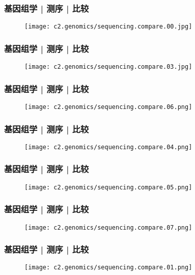 \begin{frame}
  \frametitle{基因组学 | 测序 | 比较}
  \begin{figure}
    \centering
    \texttt{[image: c2.genomics/sequencing.compare.00.jpg]}
  \end{figure}
\end{frame}

\begin{frame}
  \frametitle{基因组学 | 测序 | 比较}
  \begin{figure}
    \centering
    \texttt{[image: c2.genomics/sequencing.compare.03.jpg]}
  \end{figure}
\end{frame}

\begin{frame}
  \frametitle{基因组学 | 测序 | 比较}
  \begin{figure}
    \centering
    \texttt{[image: c2.genomics/sequencing.compare.06.png]}
  \end{figure}
\end{frame}

\begin{frame}
  \frametitle{基因组学 | 测序 | 比较}
  \begin{figure}
    \centering
    \texttt{[image: c2.genomics/sequencing.compare.04.png]}
  \end{figure}
\end{frame}

\begin{frame}
  \frametitle{基因组学 | 测序 | 比较}
  \begin{figure}
    \centering
    \texttt{[image: c2.genomics/sequencing.compare.05.png]}
  \end{figure}
\end{frame}

\begin{frame}
  \frametitle{基因组学 | 测序 | 比较}
  \begin{figure}
    \centering
    \texttt{[image: c2.genomics/sequencing.compare.07.png]}
  \end{figure}
\end{frame}

\begin{frame}
  \frametitle{基因组学 | 测序 | 比较}
  \begin{figure}
    \centering
    \texttt{[image: c2.genomics/sequencing.compare.01.png]}
  \end{figure}
\end{frame}

